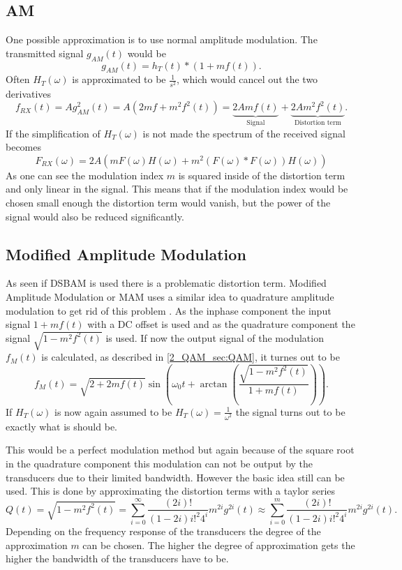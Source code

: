 \subsection{AM}
One possible approximation is to use normal amplitude modulation. The transmitted signal $g_{AM}(t)$ would be 
\begin{equation}
    g_{AM}(t) = h_T(t) * (1 + mf(t)).
\end{equation}
Often $H_T(\omega)$ is approximated to be $\frac{1}{s^2}$, which would cancel out the two derivatives
\begin{equation}
    f_{RX}(t) 
    = 
    Ag^2_{AM}(t) 
    =
    A(2mf + m^2f^2(t))
    =
   \underbrace{2Amf(t)}_{\text{Signal}} + \underbrace{2Am^2f^2(t)}_{\text{Distortion term}}.
\end{equation}
If the simplification of $H_T(\omega)$ is not made the spectrum of the received signal becomes
\begin{equation}
    F_{RX}(\omega) = 2A(mF(\omega)H(\omega) + m^2(F(\omega)*F(\omega))H(\omega))
\end{equation}
As one can see the modulation index $m$ is squared inside of the distortion term and only linear in the signal. This means that if the modulation index would be chosen small enough the distortion term would vanish, but the power of the signal would also be reduced significantly. 
\subsection{Modified Amplitude Modulation}
As seen if DSBAM is used there is a problematic distortion term. Modified Amplitude Modulation or MAM uses a similar idea to quadrature amplitude modulation to get rid of this problem \cite{MAM_Main_Paper} .
As the inphase component the input signal $1 + mf(t)$ with a DC offset is used and  as the quadrature component the signal $\sqrt{1 - m^2f^2(t)}$ is used. If now the output signal of the modulation $f_M(t)$ is calculated, as described in \ref{2_QAM_sec:QAM}, it turnes out to be
\begin{equation}
    f_M(t) = \sqrt{2 + 2mf(t)} \sin{\left(\omega_0 t + \arctan{ \left ( \frac{\sqrt{1 - m^2f^2(t)}}{1 + mf(t)} \right )} \right )}.
\end{equation}
If $H_T(\omega)$ is now again assumed to be $H_T(\omega) = \frac{1}{\omega^2}$ the signal turns out to be exactly what is should be. 

This would be a perfect modulation method but again because of the square root in the quadrature component this modulation can not be output by the transducers due to their limited bandwidth. However the basic idea still can be used. This is done by approximating the distortion terms with a taylor series
\begin{equation}
    Q(t) 
    = 
    \sqrt{1 - m^2f^2(t)}
    = 
    \sum_{i=0}^\infty \frac{(2i)!}{(1-2i) i!^2 4^i}m^{2i}g^{2i}(t) 
    \approx 
    \sum_{i=0}^m \frac{(2i)!}{(1-2i) i!^2 4^i}m^{2i}g^{2i}(t).
    \label{3_eq:mam_distortion_approx}
\end{equation}
Depending on the frequency response of the transducers the degree of the approximation $m$ can be chosen. The higher the degree of approximation gets the higher the bandwidth of the transducers have to be.
